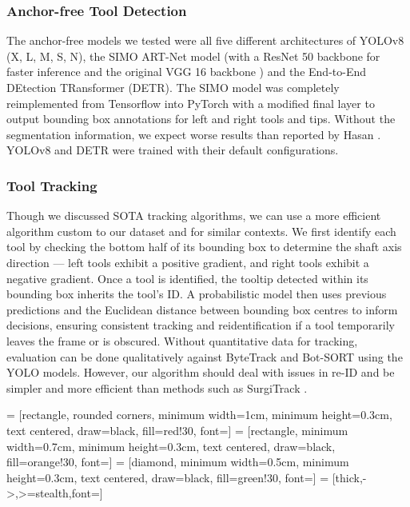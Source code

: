 \subsubsection{Anchor-free Tool Detection}

The anchor-free models we tested were all five different architectures of YOLOv8 (X, L, M, S, N), the SIMO ART-Net model (with a ResNet 50 backbone for faster inference \cite{koonce_resnet_2021} and the original VGG 16 backbone \cite{hasan_detection_2021}) and the End-to-End DEtection TRansformer (DETR). The SIMO model was completely reimplemented from Tensorflow into PyTorch with a modified final layer to output bounding box annotations for left and right tools and tips. Without the segmentation information, we expect worse results than reported by Hasan \cite{hasan_detection_2021}. YOLOv8 and DETR were trained with their default configurations.

\subsubsection{Tool Tracking}

Though we discussed SOTA tracking algorithms, we can use a more efficient algorithm custom to our dataset and for similar contexts. We first identify each tool by checking the bottom half of its bounding box to determine the shaft axis direction — left tools exhibit a positive gradient, and right tools exhibit a negative gradient. Once a tool is identified, the tooltip detected within its bounding box inherits the tool's ID. A probabilistic model then uses previous predictions and the Euclidean distance between bounding box centres to inform decisions, ensuring consistent tracking and reidentification if a tool temporarily leaves the frame or is obscured. Without quantitative data for tracking, evaluation can be done qualitatively against ByteTrack \cite{ByteTrack} and Bot-SORT \cite{BoT-SORT} using the YOLO models. However, our algorithm should deal with issues in re-ID and be simpler and more efficient than methods such as SurgiTrack \cite{SurgiTrack}.

 = [rectangle, rounded corners, minimum width=1cm, minimum height=0.3cm, text centered, draw=black, fill=red!30, font=\tiny]
 = [rectangle, minimum width=0.7cm, minimum height=0.3cm, text centered, draw=black, fill=orange!30, font=\tiny]
 = [diamond, minimum width=0.5cm, minimum height=0.3cm, text centered, draw=black, fill=green!30, font=\tiny]
 = [thick,->,>=stealth,font=\tiny]

